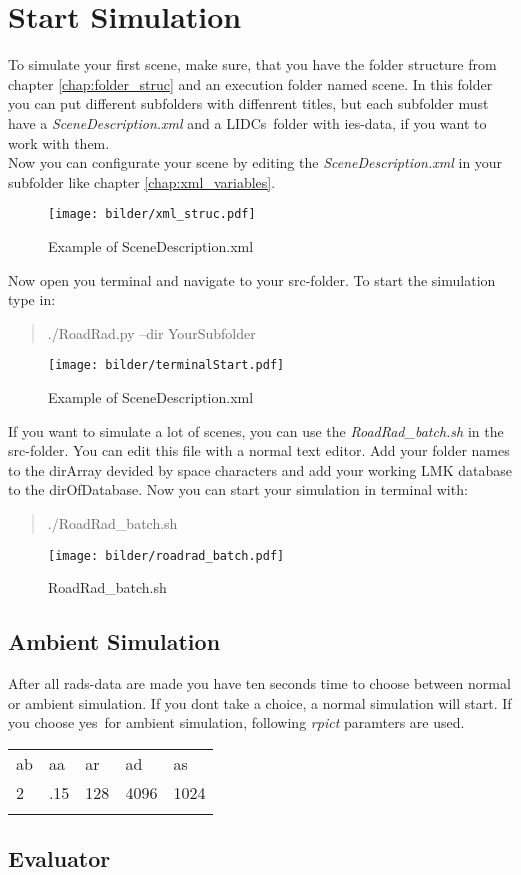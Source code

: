 \documentclass[10pt,a4paper]{report}
\newcommand{\mytoprule}{\specialrule{0.2em}{0em}{0em}}
\newcommand{\mymidrule}{\specialrule{0.1em}{0em}{0em}}
\newcommand{\mybottomrule}{\specialrule{0.2em}{0em}{0em}}
\begin{document}
\chapter{Start Simulation}

To simulate your first scene, make sure, that you have the folder structure from chapter \ref{chap:folder_struc} and an execution folder named \glqq scene\grqq. In this folder you can put different subfolders with diffenrent titles, but each subfolder must have a \textit{SceneDescription.xml} and a \glqq LIDCs\grqq\ folder with ies-data, if you want to work with them.\\
Now you can configurate your scene by editing the \textit{SceneDescription.xml} in your subfolder like chapter \ref{chap:xml_variables}.

\begin{figure}[H]
\texttt{[image: bilder/xml\_struc.pdf]} 
\caption{Example of SceneDescription.xml}
\end{figure}

Now open you terminal and navigate to your src-folder. To start the simulation type in:

\begin{quote}
./RoadRad.py --dir YourSubfolder
\end{quote}

\begin{figure}[H]
\centering
\texttt{[image: bilder/terminalStart.pdf]} 
\caption{Example of SceneDescription.xml}
\end{figure}

If you want to simulate a lot of scenes, you can use the \textit{RoadRad\_batch.sh} in the src-folder. You can edit this file with a normal text editor. Add your folder names to the dirArray devided by space characters and add your working LMK database to the dirOfDatabase. Now you can start your simulation in terminal with:

\begin{quote}
./RoadRad\_batch.sh
\end{quote}

\begin{figure}[H]
\texttt{[image: bilder/roadrad\_batch.pdf]} 
\caption{RoadRad\_batch.sh}
\end{figure}

\section{Ambient Simulation}
After all rads-data are made you have ten seconds time to choose between normal or ambient simulation. If you dont take a choice, a normal simulation will start. If you choose \glqq yes\grqq\ for ambient simulation, following \textit{rpict} paramters are used.

\renewcommand{\arraystretch}{1.5}
	\begin{longtable}{p{3cm}p{3cm}p{3cm}p{3cm}p{3cm}}
		\mytoprule
		\rowcolor{dunkelgrau}
			ab & aa & ar & ad & as \\
		\mymidrule
			2 & .15 & 128 & 4096 & 1024 \\
		\mybottomrule
	\end{longtable} 

\section{Evaluator}
\end{document}
